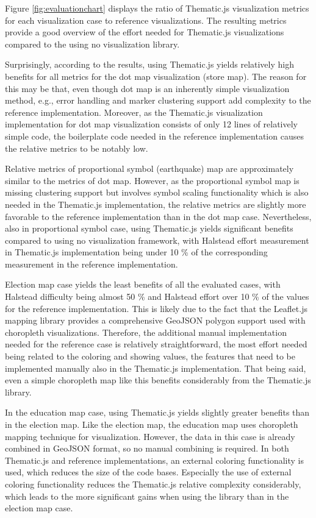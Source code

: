 Figure \ref{fig:evaluationchart} displays the ratio of Thematic.js visualization metrics for each visualization case to reference visualizations. The resulting metrics provide a good overview of the effort needed for Thematic.js visualizations compared to the using no visualization library.

Surprisingly, according to the results, using Thematic.js yields relatively high benefits for all metrics for the dot map visualization (store map). The reason for this may be that, even though dot map is an inherently simple visualization method, e.g., error handling and marker clustering support add complexity to the reference implementation. Moreover, as the Thematic.js visualization implementation for dot map visualization consists of only 12 lines of relatively simple code, the boilerplate code needed in the reference implementation causes the relative metrics to be notably low.

Relative metrics of proportional symbol (earthquake) map are approximately similar to the metrics of dot map. However, as the proportional symbol map is missing clustering support but involves symbol scaling functionality which is also needed in the Thematic.js implementation, the relative metrics are slightly more favorable to the reference implementation than in the dot map case. Nevertheless, also in proportional symbol case, using Thematic.js yields significant benefits compared to using no visualization framework, with Halstead effort measurement in Thematic.js implementation being under 10 \% of the corresponding measurement in the reference implementation.


Election map case yields the least benefits of all the evaluated cases, with Halstead difficulty being almost 50 \% and Halstead effort over 10 \% of the values for the reference implementation. This is likely due to the fact that the Leaflet.js mapping library provides a comprehensive GeoJSON polygon support used with choropleth visualizations. Therefore, the additional manual implementation needed for the reference case is relatively straightforward, the most effort needed being related to the coloring and showing values, the features that need to be implemented manually also in the Thematic.js implementation. That being said, even a simple choropleth map like this benefits considerably from the Thematic.js library.

In the education map case, using Thematic.js yields slightly greater benefits than in the election map. Like the election map, the education map uses choropleth mapping technique for visualization. However, the data in this case is already combined in GeoJSON format, so no manual combining is required. In both Thematic.js and reference implementations, an external coloring functionality is used, which reduces the size of the code bases. Especially the use of external coloring functionality reduces the Thematic.js relative complexity considerably, which leads to the more significant gains when using the library than in the election map case.

